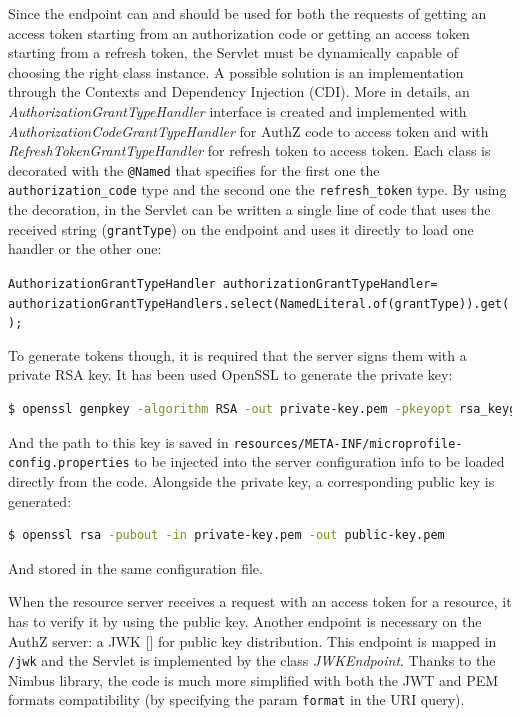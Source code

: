 Since the endpoint can and should be used for both the requests of getting an access token starting from an authorization code or getting an access token starting from a refresh token, the Servlet must be dynamically capable of choosing the right class instance. A possible solution is an implementation through the Contexts and Dependency Injection (CDI). More in details, an \textit{AuthorizationGrantTypeHandler} interface is created and implemented with \textit{AuthorizationCodeGrantTypeHandler} for AuthZ code to access token and with \textit{RefreshTokenGrantTypeHandler} for refresh token to access token. Each class is decorated with the \texttt{@Named} that specifies for the first one the \texttt{authorization\_code} type and the second one the \texttt{refresh\_token} type. By using the decoration, in the Servlet can be written a single line of code that uses the received string (\texttt{grantType}) on the endpoint and uses it directly to load one handler or the other one:

\noindent \texttt{\footnotesize{AuthorizationGrantTypeHandler authorizationGrantTypeHandler= \\
\indent authorizationGrantTypeHandlers.select(NamedLiteral.of(grantType)).get();}} 

\noindent To generate tokens though, it is required that the server signs them with a private RSA key. It has been used OpenSSL to generate the private key:

\begin{lstlisting}[language=bash, basicstyle=\fontsize{9}{11}\ttfamily]  
  $ openssl genpkey -algorithm RSA -out private-key.pem -pkeyopt rsa_keygen_bits:2048
\end{lstlisting}

\noindent And the path to this key is saved in \texttt{resources/META-INF/microprofile-config.properties} to be injected into the server configuration info to be loaded directly from the code. Alongside the private key, a corresponding public key is generated:

\begin{lstlisting}[language=bash, basicstyle=\fontsize{9}{11}\ttfamily]  
  $ openssl rsa -pubout -in private-key.pem -out public-key.pem
\end{lstlisting}

\noindent And stored in the same configuration file.

When the resource server receives a request with an access token for a resource, it has to verify it by using the public key. Another endpoint is necessary on the AuthZ server: a JWK [] for public key distribution. This endpoint is mapped in \texttt{/jwk} and the Servlet is implemented by the class \textit{JWKEndpoint}. Thanks to the Nimbus library, the code is much more simplified with both the JWT and PEM formats compatibility (by specifying the param \texttt{format} in the URI query).

